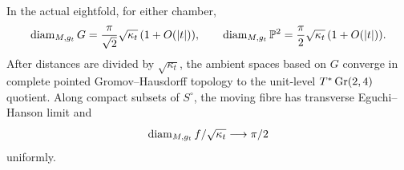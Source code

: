 \begin{proposition}\label{prop:actual-diameters}
In the actual eightfold, for either chamber,
\begin{equation}\label{eq:actual-diameters}
 \operatorname{diam}_{M,g_t}G=\frac{\pi}{\sqrt2}\sqrt{\kappa_t}\,
                  (1+O(|t|)),\qquad
 \operatorname{diam}_{M,g_t}\mathbb P^2=\frac{\pi}{2}\sqrt{\kappa_t}\,
                  (1+O(|t|)).
\end{equation}
After distances are divided by \(\sqrt{\kappa_t}\), the ambient
spaces based on \(G\) converge in complete pointed
Gromov--Hausdorff topology to the unit-level \(T^*\operatorname{Gr}(2,4)\)
quotient. Along compact subsets of \(S^\circ\), the moving fibre
has transverse Eguchi--Hanson limit and
\[
 \operatorname{diam}_{M,g_t} f/\sqrt{\kappa_t}\longrightarrow\pi/2
\]
uniformly.
\end{proposition}

